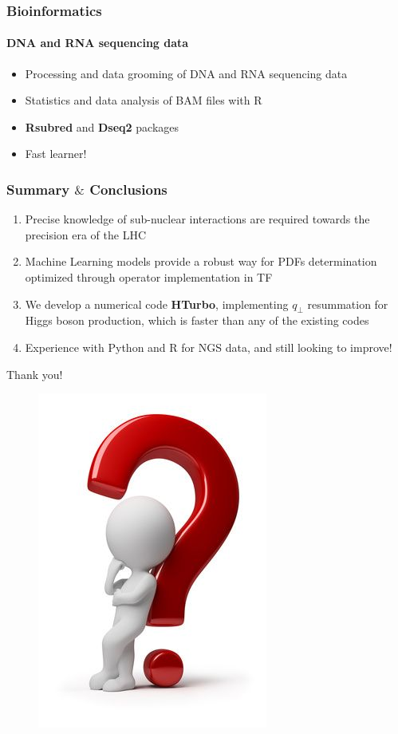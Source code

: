 \documentclass[aspectratio=43]{beamer}
\begin{document}
\begin{frame}
	
	\frametitle{Bioinformatics}
	\framesubtitle{DNA and RNA sequencing data}
	
	\begin{itemize}
		\item Processing and data grooming of DNA and RNA sequencing data
		\item Statistics and data analysis of BAM files with R
		\item \textbf{Rsubred} and \textbf{Dseq2} packages
		\item \color{blue} Fast learner!
	\end{itemize}

\end{frame}

\begin{frame}
	
	\frametitle{Summary $\&$ Conclusions}

	\vspace{2.0 cm}
	
	\begin{enumerate}
		\item \footnotesize Precise knowledge of sub-nuclear interactions are required towards the precision era of the LHC
		\item \footnotesize Machine Learning models provide a robust way for PDFs determination optimized through {\color{blue}operator implementation in TF}
		\item \footnotesize We develop a numerical code \textbf{HTurbo}, implementing $q_{\perp}$ resummation for Higgs boson production, which is {\color{blue} faster than any of the existing codes}
		\item \footnotesize Experience with Python and R for NGS data, and still looking to improve!

	\end{enumerate}

	\vspace{2.0 cm}

\end{frame}

\begin{frame}

	\center \footnotesize {\color{blue}Thank you!}

	\begin{figure}
		\includegraphics[width = 2.5 cm]{plots/thinking.png}
	\end{figure}		

\end{frame}
\end{document}
